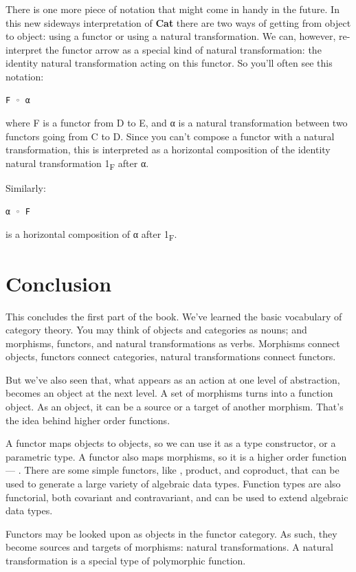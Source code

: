 There is one more piece of notation that might come in handy in the
future. In this new sideways interpretation of \textbf{Cat} there are
two ways of getting from object to object: using a functor or using a
natural transformation. We can, however, re-interpret the functor arrow
as a special kind of natural transformation: the identity natural
transformation acting on this functor. So you'll often see this
notation:

\begin{verbatim}
F ◦ α
\end{verbatim}
where F is a functor from D to E, and α is a natural transformation
between two functors going from C to D. Since you can't compose a
functor with a natural transformation, this is interpreted as a
horizontal composition of the identity natural transformation
1\textsubscript{F} after α.

Similarly:

\begin{verbatim}
α ◦ F
\end{verbatim}
is a horizontal composition of α after 1\textsubscript{F}.

\section{Conclusion}\label{conclusion}

This concludes the first part of the book. We've learned the basic
vocabulary of category theory. You may think of objects and categories
as nouns; and morphisms, functors, and natural transformations as verbs.
Morphisms connect objects, functors connect categories, natural
transformations connect functors.

But we've also seen that, what appears as an action at one level of
abstraction, becomes an object at the next level. A set of morphisms
turns into a function object. As an object, it can be a source or a
target of another morphism. That's the idea behind higher order
functions.

A functor maps objects to objects, so we can use it as a type
constructor, or a parametric type. A functor also maps morphisms, so it
is a higher order function --- . There are some simple
functors, like , product, and coproduct, that can be used
to generate a large variety of algebraic data types. Function types are
also functorial, both covariant and contravariant, and can be used to
extend algebraic data types.

Functors may be looked upon as objects in the functor category. As such,
they become sources and targets of morphisms: natural transformations. A
natural transformation is a special type of polymorphic function.

